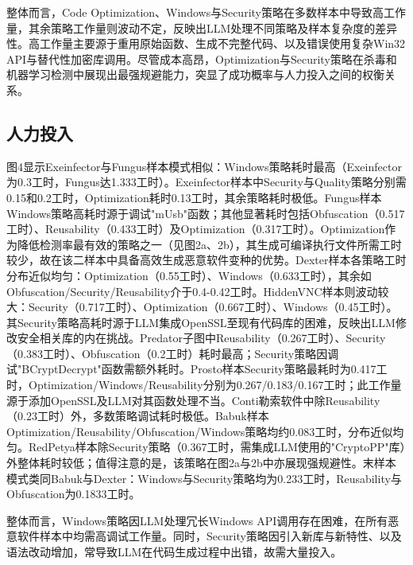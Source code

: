 整体而言，Code Optimization、Windows与Security策略在多数样本中导致高工作量，其余策略工作量则波动不定，反映出LLM处理不同策略及样本复杂度的差异性。高工作量主要源于重用原始函数、生成不完整代码、以及错误使用复杂Win32 API与替代性加密库调用。尽管成本高昂，Optimization与Security策略在杀毒和机器学习检测中展现出最强规避能力，突显了成功概率与人力投入之间的权衡关系。

\subsection{人力投入}
图4显示Exeinfector与Fungus样本模式相似：Windows策略耗时最高（Exeinfector为0.3工时，Fungus达1.333工时）。Exeinfector样本中Security与Quality策略分别需0.15和0.2工时，Optimization耗时0.13工时，其余策略耗时极低。Fungus样本Windows策略高耗时源于调试"mUsb"函数；其他显著耗时包括Obfuscation（0.517工时）、Reusability（0.433工时）及Optimization（0.317工时）。Optimization作为降低检测率最有效的策略之一（见图2a、2b），其生成可编译执行文件所需工时较少，故在该二样本中具备高效生成恶意软件变种的优势。Dexter样本各策略工时分布近似均匀：Optimization（0.55工时）、Windows（0.633工时），其余如Obfuscation/Security/Reusability介于0.4-0.42工时。HiddenVNC样本则波动较大：Security（0.717工时）、Optimization（0.667工时）、Windows（0.45工时）。其Security策略高耗时源于LLM集成OpenSSL至现有代码库的困难，反映出LLM修改安全相关库的内在挑战。Predator子图中Reusability（0.267工时）、Security（0.383工时）、Obfuscation（0.2工时）耗时最高；Security策略因调试"BCryptDecrypt"函数需额外耗时。Prosto样本Security策略最耗时为0.417工时，Optimization/Windows/Reusability分别为0.267/0.183/0.167工时；此工作量源于添加OpenSSL及LLM对其函数处理不当。Conti勒索软件中除Reusability（0.23工时）外，多数策略调试耗时极低。Babuk样本Optimization/Reusability/Obfuscation/Windows策略均约0.083工时，分布近似均匀。RedPetya样本除Security策略（0.367工时，需集成LLM使用的"CryptoPP"库）外整体耗时较低；值得注意的是，该策略在图2a与2b中亦展现强规避性。末样本模式类同Babuk与Dexter：Windows与Security策略均为0.233工时，Reusability与Obfuscation为0.1833工时。

整体而言，Windows策略因LLM处理冗长Windows API调用存在困难，在所有恶意软件样本中均需高调试工作量。同时，Security策略因引入新库与新特性、以及语法改动增加，常导致LLM在代码生成过程中出错，故需大量投入。

